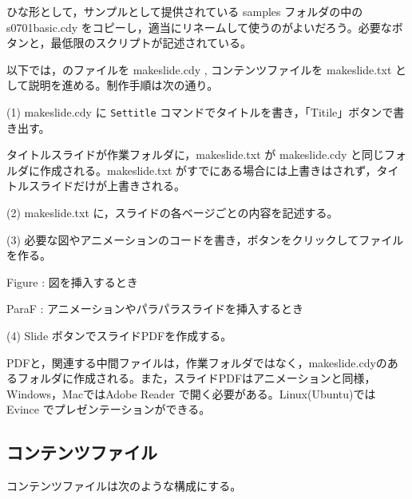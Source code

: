 \documentclass[papersize,a4paper,12pt,uplatex]{jsarticle}
\begin{document}
\vspace{\baselineskip}
ひな形として，サンプルとして提供されている samples フォルダの中の s0701basic.cdy をコピーし，適当にリネームして使うのがよいだろう。必要なボタンと，最低限のスクリプトが記述されている。

以下では，\ketcindy のファイルを makeslide.cdy , コンテンツファイルを makeslide.txt として説明を進める。制作手順は次の通り。

(1) makeslide.cdy に \verb|Settitle| コマンドでタイトルを書き，「Titile」ボタンで書き出す。

タイトルスライドが作業フォルダに，makeslide.txt が makeslide.cdy と同じフォルダに作成される。makeslide.txt がすでにある場合には上書きはされず，タイトルスライドだけが上書きされる。

(2) makeslide.txt に，スライドの各ベージごとの内容を記述する。

(3) 必要な図やアニメーションのコードを書き，ボタンをクリックしてファイルを作る。

\hspace{10mm}Figure : 図を挿入するとき

\hspace{10mm}ParaF : アニメーションやパラパラスライドを挿入するとき

(4) Slide ボタンでスライドPDFを作成する。

PDFと，関連する中間ファイルは，作業フォルダではなく，makeslide.cdyのあるフォルダに作成される。また，スライドPDFはアニメーションと同様，Windows，MacではAdobe Reader で開く必要がある。Linux(Ubuntu)では Evince でプレゼンテーションができる。

\subsection{コンテンツファイル}

コンテンツファイルは次のような構成にする。
\end{document}
